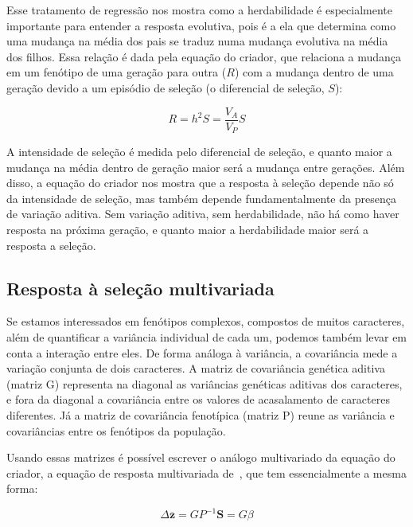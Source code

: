 \begin{refsection}
Esse tratamento de regressão nos mostra como a herdabilidade é especialmente
importante para entender a resposta evolutiva, pois é a ela que determina como
uma mudança na média dos pais se traduz numa mudança evolutiva na média dos
filhos. Essa relação é dada pela equação do criador, que relaciona a mudança
em um fenótipo de uma geração para outra ($R$) com a mudança dentro de uma
geração devido a um episódio de seleção (o diferencial de seleção, $S$):

\begin{equation}
R = h^2S = \frac{V_A}{V_P}S	
\end{equation}

A intensidade de seleção é medida pelo diferencial de seleção, e quanto maior
a mudança na média dentro de geração maior será a mudança entre gerações. Além
disso, a equação do criador nos mostra que a resposta à seleção depende não só
da intensidade de seleção, mas também depende fundamentalmente da presença de
variação aditiva. Sem variação aditiva, sem herdabilidade, não há como haver
resposta na próxima geração, e quanto maior a herdabilidade maior será a
resposta a seleção.

\subsection{Resposta à seleção multivariada}

Se estamos interessados em fenótipos complexos, compostos de muitos
caracteres, além de quantificar a variância individual de cada um, podemos
também levar em conta a interação entre eles. De forma análoga à variância, a
covariância mede a variação conjunta de dois caracteres. A matriz de
covariância genética aditiva (matriz G) representa na diagonal as variâncias
genéticas aditivas dos caracteres, e fora da diagonal a covariância entre os
valores de acasalamento de caracteres diferentes. Já a matriz de covariância
fenotípica (matriz P) reune as variância e covariâncias entre os fenótipos da
população.

Usando essas matrizes é possível escrever o análogo multivariado da equação do
criador, a equação de resposta multivariada de~\textcite{Lande1979-by}, que
tem essencialmente a mesma forma:

\begin{equation}
\Delta \mathbf{\overline z} = GP^{-1}\mathbf{S} = G\beta
\end{equation}


\end{refsection}
